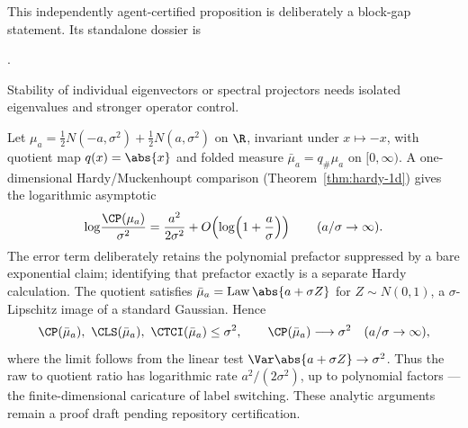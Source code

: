 \documentclass[../../main.tex]{subfiles}
\begin{document}
This independently agent-certified proposition is deliberately a block-gap statement.  Its
standalone dossier is
\begin{center}\small
{}.
\end{center}
Stability of individual eigenvectors or spectral projectors needs isolated eigenvalues and
stronger operator control.

\begin{example}
\label{ex:a5-folding}
Let $\mu_a=\tfrac12N(-a,\sigma^2)+\tfrac12N(a,\sigma^2)$ on $\R$, invariant under
$x\mapsto-x$, with quotient map $q(x)=\abs{x}$ and folded measure $\bar\mu_a=q_\#\mu_a$ on
$[0,\infty)$. A one-dimensional Hardy/Muckenhoupt comparison
(Theorem~\ref{thm:hardy-1d}) gives the logarithmic asymptotic
\[
 \log\!\frac{\CP(\mu_a)}{\sigma^2}
 =\frac{a^2}{2\sigma^2}+O\!\left(\log\!\left(1+\frac a\sigma\right)\right)
 \qquad (a/\sigma\to\infty).
\]
The error term deliberately retains the polynomial prefactor suppressed by a bare exponential
claim; identifying that prefactor exactly is a separate Hardy calculation. The quotient
satisfies $\bar\mu_a=\operatorname{Law}\abs{a+\sigma Z}$ for $Z\sim N(0,1)$, a $\sigma$-Lipschitz image of a
standard Gaussian. Hence
\[
 \CP(\bar\mu_a),\ \CLS(\bar\mu_a),\ \CTCI(\bar\mu_a)\le\sigma^2,
 \qquad \CP(\bar\mu_a)\longrightarrow\sigma^2
 \quad(a/\sigma\to\infty),
\]
where the limit follows from the linear test $\Var\abs{a+\sigma Z}\to\sigma^2$. Thus the raw to
quotient ratio has logarithmic rate $a^2/(2\sigma^2)$, up to polynomial factors --- the
finite-dimensional caricature of label switching. These analytic arguments remain a proof draft
pending repository certification.
\end{example}
\end{document}
